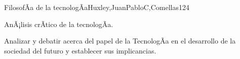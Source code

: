 \begin{syllabus}
\begin{unit}{FilosofÃ­a de la tecnologÃ­a}{Huxley,JuanPabloC,Comellas}{12}{4}
\begin{topics}
      \item {AnÃ¡lisis crÃ­tico de la tecnologÃ­a.}
\end{topics}
\begin{unitgoals}
	\item Analizar  y debatir acerca del papel de la TecnologÃ­a en el desarrollo de la sociedad del futuro y establecer  sus implicancias. 
\end{unitgoals}
\end{unit}



\begin{coursebibliography}
\end{coursebibliography}

\end{syllabus}

%
